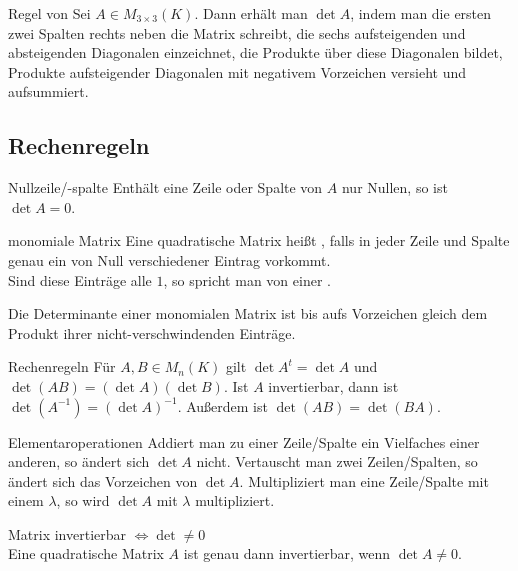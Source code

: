 \begin{Satz}{Regel von }
    Sei $A \in M_{3 \times 3}(K)$.
    Dann erhält man $\det A$, indem man die ersten zwei Spalten rechts neben
    die Matrix schreibt, die sechs aufsteigenden und absteigenden Diagonalen
    einzeichnet, die Produkte über diese Diagonalen bildet, Produkte
    aufsteigender Diagonalen mit negativem Vorzeichen versieht und aufsummiert.
\end{Satz}

\subsection{%
    Rechenregeln%
}

\begin{Lemma}{Nullzeile/-spalte}
    Enthält eine Zeile oder Spalte von $A$ nur Nullen, so ist $\det A = 0$.
\end{Lemma}

\begin{Def}{monomiale Matrix}
    Eine quadratische Matrix heißt , falls in jeder Zeile und
    Spalte genau ein von Null verschiedener Eintrag vorkommt. \\
    Sind diese Einträge alle $1$, so spricht man von einer
    .
\end{Def}

\begin{Kor}
    Die Determinante einer monomialen Matrix ist bis aufs Vorzeichen gleich
    dem Produkt ihrer nicht-verschwindenden Einträge.
\end{Kor}

\begin{Satz}{Rechenregeln}
    Für $A, B \in M_n(K)$ gilt
    $\det A^t = \det A$ und $\det(AB) = (\det A)(\det B)$.
    Ist $A$ invertierbar, dann ist $\det (A^{-1}) = (\det A)^{-1}$.
    \qquad Außerdem ist $\det(AB) = \det(BA)$.
\end{Satz}

\begin{Satz}{Elementaroperationen}
    Addiert man zu einer Zeile/Spalte ein Vielfaches einer anderen, so ändert
    sich $\det A$ nicht.
    Vertauscht man zwei Zeilen/Spalten, so ändert sich das Vorzeichen von
    $\det A$.
    Multipliziert man eine Zeile/Spalte mit einem $\lambda$, so wird $\det A$
    mit $\lambda$ multipliziert.
\end{Satz}

\begin{Satz}{Matrix invertierbar $\Leftrightarrow \det \not= 0$} \\
    Eine quadratische Matrix $A$ ist genau dann invertierbar, wenn
    $\det A \not= 0$.
\end{Satz}

